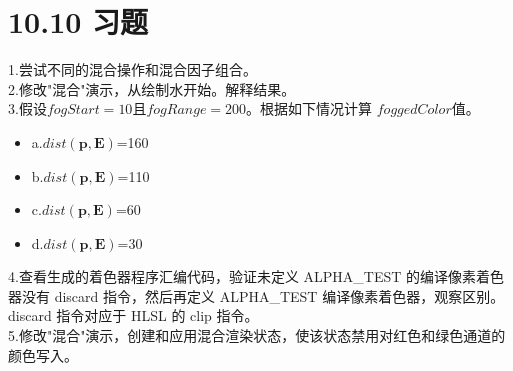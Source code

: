 \chapter{10.10 习题}
\begin{flushleft}
1.尝试不同的混合操作和混合因子组合。\\
2.修改"混合"演示，从绘制水开始。解释结果。\\
3.假设$fogStart=10$且$fogRange=200$。根据如下情况计算 $foggedColor$值。\\
\begin{itemize}
  \item a.$dist(\boldsymbol{p},\boldsymbol{E})$=160
  \item b.$dist(\boldsymbol{p},\boldsymbol{E})$=110
  \item c.$dist(\boldsymbol{p},\boldsymbol{E})$=60
  \item d.$dist(\boldsymbol{p},\boldsymbol{E})$=30
\end{itemize}
4.查看生成的着色器程序汇编代码，验证未定义 ALPHA\_TEST 的编译像素着色器没有 discard 指令，然后再定义 ALPHA\_TEST 编译像素着色器，观察区别。discard 指令对应于 HLSL 的 clip 指令。\\

5.修改"混合"演示，创建和应用混合渲染状态，使该状态禁用对红色和绿色通道的颜色写入。\\
\end{flushleft}
